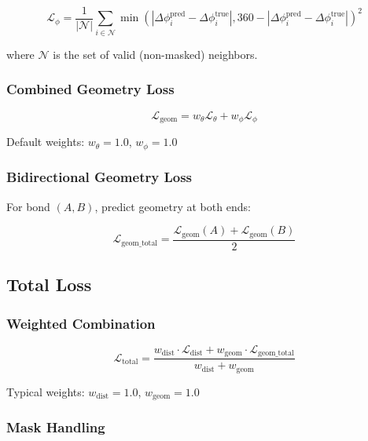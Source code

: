 \documentclass[11pt,a4paper]{article}
\begin{document}
\begin{equation}
\mathcal{L}_{\phi} = \frac{1}{|\mathcal{N}|} \sum_{i \in \mathcal{N}} \min(|\Delta\phi_i^{\text{pred}} - \Delta\phi_i^{\text{true}}|, 360 - |\Delta\phi_i^{\text{pred}} - \Delta\phi_i^{\text{true}}|)^2
\end{equation}

where $\mathcal{N}$ is the set of valid (non-masked) neighbors.

\subsubsection{Combined Geometry Loss}

\begin{equation}
\mathcal{L}_{\text{geom}} = w_{\theta} \mathcal{L}_{\theta} + w_{\phi} \mathcal{L}_{\phi}
\end{equation}

Default weights: $w_{\theta} = 1.0$, $w_{\phi} = 1.0$

\subsubsection{Bidirectional Geometry Loss}

For bond $(A, B)$, predict geometry at both ends:

\begin{equation}
\mathcal{L}_{\text{geom\_total}} = \frac{\mathcal{L}_{\text{geom}}(A) + \mathcal{L}_{\text{geom}}(B)}{2}
\end{equation}

\subsection{Total Loss}

\subsubsection{Weighted Combination}

\begin{equation}
\mathcal{L}_{\text{total}} = \frac{w_{\text{dist}} \cdot \mathcal{L}_{\text{dist}} + w_{\text{geom}} \cdot \mathcal{L}_{\text{geom\_total}}}{w_{\text{dist}} + w_{\text{geom}}}
\end{equation}

Typical weights: $w_{\text{dist}} = 1.0$, $w_{\text{geom}} = 1.0$

\subsubsection{Mask Handling}
\end{document}
